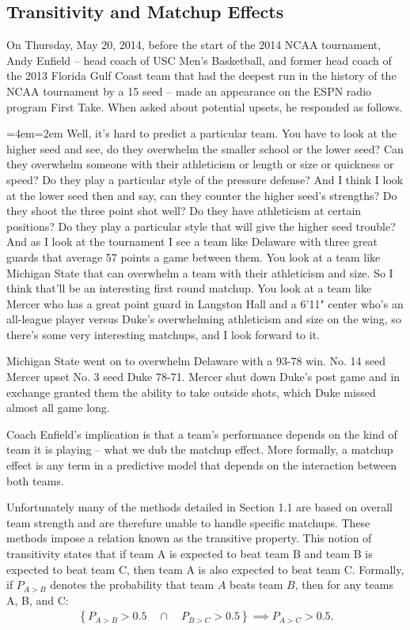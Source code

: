 \documentclass[letterpaper,12pt]{article}
\newenvironment{blockquote}{%
  \par%
  \medskip
  \leftskip=4em\rightskip=2em%
  \noindent\ignorespaces}{%
  \par\medskip}
\begin{document}
\subsection{Transitivity and Matchup Effects}
On Thursday, May 20, 2014, before the start of the 2014 NCAA tournament, Andy Enfield -- head coach of USC Men's Basketball, and former head coach of the 2013 Florida Gulf Coast team that had the deepest run in the history of the NCAA tournament by a 15 seed -- made an appearance on the ESPN radio program First Take. When asked about potential upsets, he responded as follows. 
\begin{blockquote}
\indent Well, it's hard to predict a particular team. You have to look at the higher seed and see, do they overwhelm the smaller school or the lower seed? Can they overwhelm someone with their athleticism or length or size or quickness or speed? Do they play a particular style of the pressure defense? And I think I look at the lower seed then and say, can they counter the higher seed's strengths? Do they shoot the three point shot well? Do they have athleticism at certain positions? Do they play a particular style that will give the higher seed trouble? 
\indent And as I look at the tournament I see a team like Delaware with three great guards that average 57 points a game between them. You look at a team like Michigan State that can overwhelm a team with their athleticism and size. So I think that'll be an interesting first round matchup. You look at a team like Mercer who has a great point guard in Langston Hall and a 6'11" center who's an all-league player versus Duke's overwhelming athleticism and size on the wing, so there's some very interesting matchups, and I look forward to it.
\end{blockquote}
\noindent Michigan State went on to overwhelm Delaware with a 93-78 win. No. 14 seed Mercer upset No. 3 seed Duke 78-71. Mercer shut down Duke's post game and in exchange granted them the ability to take outside shots, which Duke missed almost all game long.

Coach Enfield's implication is that a team's performance depends on the kind of team it is playing -- what we dub the matchup effect. More formally, a matchup effect is any term in a predictive model that depends on the interaction between both teams. 

Unfortunately many of the methods detailed in Section 1.1 are based on overall team strength and are therefure unable to handle specific matchups. These methods impose a relation known as the transitive property. This notion of transitivity states that if team A is expected to beat team B and team B is expected to beat team C, then team A is also expected to beat team C. Formally, if $P_{A>B}$ denotes the probability that team $A$ beats team $B$, then for any teams A, B, and C: 
\begin{eqnarray*}
\left \{P_{A>B} > 0.5 \quad \cap \quad P_{B>C} > 0.5 \right\} \implies P_{A>C} > 0.5.
\label{eq:trans}
\end{eqnarray*}
\end{document}
